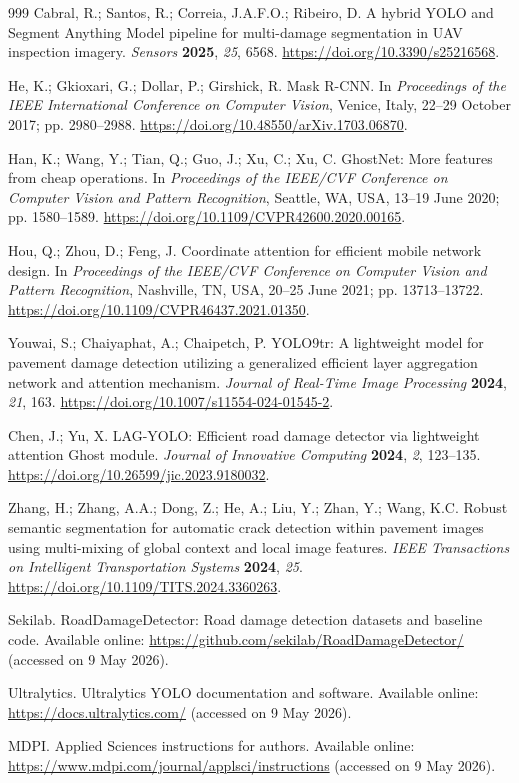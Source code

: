\documentclass[applsci,article,submit,moreauthors]{Definitions/mdpi}
\begin{document}
\begin{thebibliography}{999}
Cabral, R.; Santos, R.; Correia, J.A.F.O.; Ribeiro, D. A hybrid YOLO and Segment Anything Model pipeline for multi-damage segmentation in UAV inspection imagery. \textit{Sensors} \textbf{2025}, \textit{25}, 6568. \url{https://doi.org/10.3390/s25216568}.

He, K.; Gkioxari, G.; Dollar, P.; Girshick, R. Mask R-CNN. In \textit{Proceedings of the IEEE International Conference on Computer Vision}, Venice, Italy, 22--29 October 2017; pp. 2980--2988. \url{https://doi.org/10.48550/arXiv.1703.06870}.

Han, K.; Wang, Y.; Tian, Q.; Guo, J.; Xu, C.; Xu, C. GhostNet: More features from cheap operations. In \textit{Proceedings of the IEEE/CVF Conference on Computer Vision and Pattern Recognition}, Seattle, WA, USA, 13--19 June 2020; pp. 1580--1589. \url{https://doi.org/10.1109/CVPR42600.2020.00165}.

Hou, Q.; Zhou, D.; Feng, J. Coordinate attention for efficient mobile network design. In \textit{Proceedings of the IEEE/CVF Conference on Computer Vision and Pattern Recognition}, Nashville, TN, USA, 20--25 June 2021; pp. 13713--13722. \url{https://doi.org/10.1109/CVPR46437.2021.01350}.

Youwai, S.; Chaiyaphat, A.; Chaipetch, P. YOLO9tr: A lightweight model for pavement damage detection utilizing a generalized efficient layer aggregation network and attention mechanism. \textit{Journal of Real-Time Image Processing} \textbf{2024}, \textit{21}, 163. \url{https://doi.org/10.1007/s11554-024-01545-2}.

Chen, J.; Yu, X. LAG-YOLO: Efficient road damage detector via lightweight attention Ghost module. \textit{Journal of Innovative Computing} \textbf{2024}, \textit{2}, 123--135. \url{https://doi.org/10.26599/jic.2023.9180032}.

Zhang, H.; Zhang, A.A.; Dong, Z.; He, A.; Liu, Y.; Zhan, Y.; Wang, K.C. Robust semantic segmentation for automatic crack detection within pavement images using multi-mixing of global context and local image features. \textit{IEEE Transactions on Intelligent Transportation Systems} \textbf{2024}, \textit{25}. \url{https://doi.org/10.1109/TITS.2024.3360263}.

Sekilab. RoadDamageDetector: Road damage detection datasets and baseline code. Available online: \url{https://github.com/sekilab/RoadDamageDetector/} (accessed on 9 May 2026).

Ultralytics. Ultralytics YOLO documentation and software. Available online: \url{https://docs.ultralytics.com/} (accessed on 9 May 2026).

MDPI. Applied Sciences instructions for authors. Available online: \url{https://www.mdpi.com/journal/applsci/instructions} (accessed on 9 May 2026).

\end{thebibliography}
\end{document}

